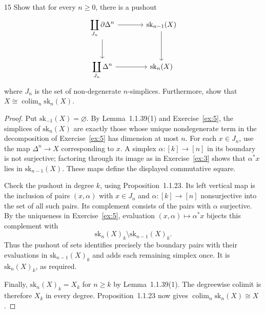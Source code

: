 \begin{exercise}{15}
Show that for every $n\ge0$, there is a pushout
\[
 \begin{tikzcd}[column sep=large,row sep=large]
  \displaystyle\coprod_{J_n}\partial\Delta^n \arrow[r] \arrow[d]
    & \mathrm{sk}_{n-1}(X) \arrow[d] \\
  \displaystyle\coprod_{J_n}\Delta^n \arrow[r]
    & \mathrm{sk}_n(X)
 \end{tikzcd}
\]
\begingroup\sloppy
where $J_n$ is the set of non-degenerate $n$-simplices. Furthermore,
show that $X\cong\operatorname*{colim}_n\mathrm{sk}_n(X)$.
\par\endgroup

\begin{proof}
Put $\mathrm{sk}_{-1}(X)=\varnothing$.
By Lemma~1.1.39(1) and Exercise~\ref{ex:5}, the simplices of
$\mathrm{sk}_n(X)$ are exactly those whose unique nondegenerate
term in the decomposition of Exercise~\ref{ex:5} has dimension at most $n$.
For each $x\in J_n$, use the map $\Delta^n\to X$ corresponding to
$x$. A simplex $\alpha\colon[k]\to[n]$ in its boundary is not
surjective; factoring through its image as in Exercise~\ref{ex:3}
shows that $\alpha^*x$ lies in $\mathrm{sk}_{n-1}(X)$.
These maps define the displayed commutative square.

Check the pushout in degree $k$, using Proposition~1.1.23.
Its left vertical map is the inclusion of pairs $(x,\alpha)$ with
$x\in J_n$ and $\alpha\colon[k]\to[n]$ nonsurjective into the set
of all such pairs. Its complement consists of the pairs with
$\alpha$ surjective. By the uniqueness in Exercise~\ref{ex:5},
evaluation $(x,\alpha)\mapsto\alpha^*x$ bijects this complement
with
\[
 \mathrm{sk}_n(X)_k\setminus\mathrm{sk}_{n-1}(X)_k.
\]
Thus the pushout of sets identifies precisely the boundary pairs
with their evaluations in $\mathrm{sk}_{n-1}(X)_k$ and adds each
remaining simplex once. It is $\mathrm{sk}_n(X)_k$, as required.

Finally, $\mathrm{sk}_n(X)_k=X_k$ for $n\ge k$ by
Lemma~1.1.39(1). The degreewise colimit is therefore $X_k$ in every
degree. Proposition~1.1.23 now gives
$\operatorname*{colim}_n\mathrm{sk}_n(X)\cong X$.
\end{proof}
\end{exercise}
